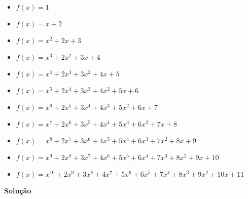 \documentclass[12pt, a4paper]{article}
\begin{document}
\begin{itemize}
	\item $f(x) = 1$
	\item $f(x) = x + 2$
	\item $f(x) = x^2 + 2x + 3$
	\item $f(x) = x^3 + 2x^2 + 3x + 4$
	\item $f(x) = x^4 + 2x^3 + 3x^2 + 4x + 5$
	\item $f(x) = x^5 + 2x^4 + 3x^3 + 4x^2 + 5x + 6$
	\item $f(x) = x^6 + 2x^5 + 3x^4 + 4x^3 + 5x^2 + 6x + 7$
	\item $f(x) = x^7 + 2x^6 + 3x^5 + 4x^4 + 5x^3 + 6x^2 + 7x + 8$
	\item $f(x) = x^8 + 2x^7 + 3x^6 + 4x^5 + 5x^4 + 6x^3 + 7x^2 + 8x + 9$
	\item $f(x) = x^9 + 2x^8 + 3x^7 + 4x^6 + 5x^5 + 6x^4 + 7x^3 + 8x^2 + 9x + 10$
	\item $f(x) = x^{10} + 2x^9 + 3x^8 + 4x^7 + 5x^6 + 6x^5 + 7x^4 + 8x^3 + 9x^2 + 10x + 11$
\end{itemize}

\textbf{Solução}
\end{document}
